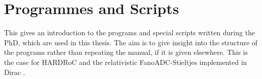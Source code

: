 \chapter{Programmes and Scripts}
\label{app:programs}

This gives an introduction to the programs and special scripts
written during the PhD, which are used in this thesis. The aim is
to give insight into the structure of the programs rather than repeating
the manual, if it is given elsewhere. This is the case for HARDRoC
\cite{HARDRoC} and the relativistic FanoADC-Stieltjes implemented in Dirac
\cite{DIRAC13}.





